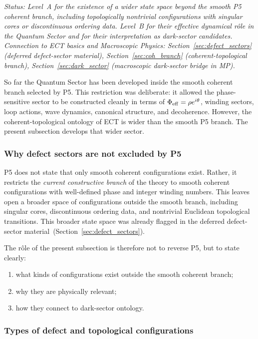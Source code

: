 \textit{Status: Level~A for the existence of a wider state space
beyond the smooth P5 coherent branch, including topologically
nontrivial configurations with singular cores or discontinuous
ordering data.
Level~B for their effective dynamical r\^ole in the Quantum Sector
and for their interpretation as dark-sector candidates.
Connection to ECT basics and Macroscopic Physics:
Section~\ref{sec:defect_sectors} (deferred defect-sector material),
Section~\ref{sec:coh_branch} (coherent-topological branch),
Section~\ref{sec:dark_sector} (macroscopic dark-sector bridge in MP).}

\medskip
So far the Quantum Sector has been developed inside the smooth coherent
branch selected by P5.
This restriction was deliberate: it allowed the phase-sensitive sector
to be constructed cleanly in terms of $\Phi_{\rm eff}=\rho e^{i\theta}$,
winding sectors, loop actions, wave dynamics, canonical structure,
and decoherence.
However, the coherent-topological ontology of ECT is wider than the
smooth P5 branch.
The present subsection develops that wider sector.

\subsubsection*{Why defect sectors are not excluded by P5}

P5 does not state that only smooth coherent configurations exist.
Rather, it restricts the \emph{current constructive branch} of the
theory to smooth coherent configurations with well-defined phase and
integer winding numbers.
This leaves open a broader space of configurations outside the smooth
branch, including singular cores, discontinuous ordering data, and
nontrivial Euclidean topological transitions.
This broader state space was already flagged in the deferred
defect-sector material~(Section~\ref{sec:defect_sectors}).

The r\^ole of the present subsection is therefore not to reverse P5,
but to state clearly:
\begin{enumerate}[label=(\roman*)]
  \item what kinds of configurations exist outside the smooth coherent
    branch;
  \item why they are physically relevant;
  \item how they connect to dark-sector ontology.
\end{enumerate}

\subsubsection*{Types of defect and topological configurations}

